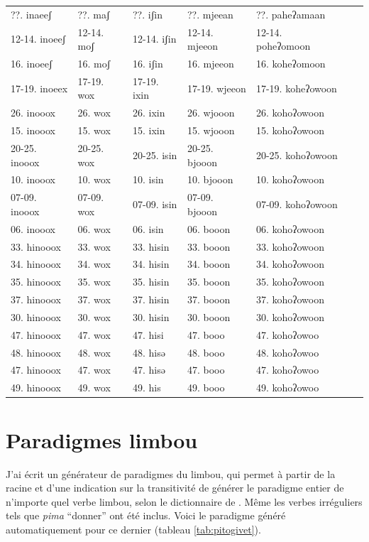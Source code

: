 \documentclass[oldfontcommands,oneside,a4paper,11pt]{memoir}
\begin{document}
\begin{table}[h]
{\begin{tabular}{lllllll}
	??. inaeeʃ 	&	??. maʃ 	&	??. iʃin 	&	??. mjeean 	&	??. paheʔamaan 	\\
	12-14. inoeeʃ 	&	12-14. moʃ 	&	12-14. iʃin 	&	12-14. mjeeon 	&	12-14. poheʔomoon 	\\
	16. inoeeʃ 	&	16. moʃ 	&	16. iʃin 	&	16. mjeeon 	&	16. koheʔomoon 	\\
	17-19. inoeex 	&	17-19. wox 	&	17-19. ixin 	&	17-19. wjeeon 	&	17-19. koheʔowoon 	\\
	26. inooox 	&	26. wox 	&	26. ixin 	&	26. wjooon 	&	26. kohoʔowoon 	\\
	15. inooox 	&	15. wox 	&	15. ixin 	&	15. wjooon 	&	15. kohoʔowoon 	\\
	20-25. inooox 	&	20-25. wox 	&	20-25. isin 	&	20-25. bjooon 	&	20-25. kohoʔowoon 	\\
	10. inooox 	&	10. wox 	&	10. isin 	&	10. bjooon 	&	10. kohoʔowoon 	\\
	07-09. inooox 	&	07-09. wox 	&	07-09. isin 	&	07-09. bjooon 	&	07-09. kohoʔowoon 	\\
	06. inooox 	&	06. wox 	&	06. isin 	&	06. booon 	&	06. kohoʔowoon 	\\
	33. hinooox 	&	33. wox 	&	33. hisin 	&	33. booon 	&	33. kohoʔowoon 	\\
	34. hinooox 	&	34. wox 	&	34. hisin 	&	34. booon 	&	34. kohoʔowoon 	\\
	35. hinooox 	&	35. wox 	&	35. hisin 	&	35. booon 	&	35. kohoʔowoon 	\\
	37. hinooox 	&	37. wox 	&	37. hisin 	&	37. booon 	&	37. kohoʔowoon 	\\
	30. hinooox 	&	30. wox 	&	30. hisin 	&	30. booon 	&	30. kohoʔowoon 	\\
	47. hinooox 	&	47. wox 	&	47. hisi 	&	47. booo 	&	47. kohoʔowoo 	\\
	48. hinooox 	&	48. wox 	&	48. hisə 	&	48. booo 	&	48. kohoʔowoo 	\\
	47. hinooox 	&	47. wox 	&	47. hisə 	&	47. booo 	&	47. kohoʔowoo 	\\
	49. hinooox 	&	49. wox 	&	49. his 	&	49. booo 	&	49. kohoʔowoo 	\\

\bottomrule
\end{tabular}}
\end{table}



\section{Paradigmes limbou}
J'ai écrit un générateur de paradigmes du limbou, qui permet à partir de la racine et d'une indication sur la transitivité de générer le paradigme entier de n'importe quel verbe limbou, selon le dictionnaire de \citet{michailovsky02dico}. Même les verbes irréguliers tels que \textit{pima} ``donner'' ont été inclus. Voici le paradigme généré automatiquement pour ce dernier (tableau \ref{tab:pitogivet}).
\end{document}
